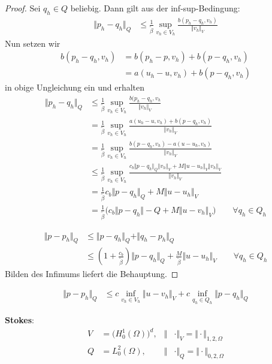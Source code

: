 \begin{proof}
	Sei $q_h\in Q$ beliebig. Dann gilt aus der inf-sup-Bedingung:
	\begin{align*}
		\Vert p_h-q_h\Vert_Q
		&\leq\frac{1}{\tilde{\beta}}\sup\limits_{v_h\in V_h}\frac{b(p_h-q_h,v_h)}{\Vert v_h\Vert_V}
	\end{align*}
	Nun setzen wir
	\begin{align*}
		b(p_h-q_h,v_h)
		&=b(p_h-p,v_h)+b(p-q_h,v_h)\\
		&=a(u_h-u,v_h)+b(p-q_h,v_h)
	\end{align*}
	in obige Ungleichung ein und erhalten
	\begin{align*}
		\Vert p_h-q_h\Vert_Q
		&\leq\frac{1}{\tilde{\beta}}\sup\limits_{v_h\in V_h}\frac{b(p_h-q_h,v_h}{\Vert v_h\Vert_V}\\
		&=\frac{1}{\tilde{\beta}}\sup\limits_{v_h\in V_h}\frac{a(u_h-u,v_h)+b(p-q_h,v_h)}{\Vert v_h\Vert_V}\\
		&=\frac{1}{\tilde{\beta}}\sup\limits_{v_h\in V_h}\frac{b(p-q_h,v_h)-a(u-u_h,v_h)}{\Vert v_h\Vert_V}\\
		&\leq\frac{1}{\tilde{\beta}}\sup\limits_{v_h\in V_h}\frac{c_b\Vert p-q_h\Vert_Q\Vert v_h\Vert_V+M\Vert u-u_h\Vert_V\Vert v_h\Vert_V}{\Vert v_h\Vert_V}\\
		&=\frac{1}{\tilde{\beta}}c_b\Vert p-q_h\Vert_Q+M\Vert u-u_h\Vert_V\\
		&=\frac{1}{\tilde{\beta}}\Big(c_b\Vert p-q_h\Vert-Q+M\Vert u-v_h\Vert_V\Big)\qquad\forall q_h\in Q_h
	\end{align*}
	
	\begin{align*}
		\Vert p-p_h\Vert_Q
		&\leq\Vert p-q_h\Vert_Q+\Vert q_h-p_h\Vert_Q\\
		&\leq \left(1+\frac{c_b}{\tilde{\beta}}\right)\Vert p-q_h\Vert_Q+\frac{M}{\tilde{\beta}}\Vert u-u_h\Vert_V\qquad\forall q_h\in Q_h
	\end{align*}
	Bilden des Infimums liefert die Behauptung.
\end{proof}

\begin{bemerkung}
	\begin{align*}
		\Vert p-p_h\Vert_Q
		&\leq c\inf\limits_{v_h\in V_h}\Vert u-v_h\Vert_V+c\inf\limits_{q_h\in Q_h}\Vert p-q_h\Vert_Q
	\end{align*}
\end{bemerkung}

\textbf{Stokes}:
\begin{align*}
	V&=\big(H_0^1(\Omega)\big)^d, &\Vert&\cdot\Vert_V=\Vert\cdot\Vert_{1,2,\Omega}\\
	Q&=L_0^2(\Omega), &\Vert&\cdot\Vert_Q=\Vert\cdot\Vert_{0,2,\Omega}
\end{align*}


